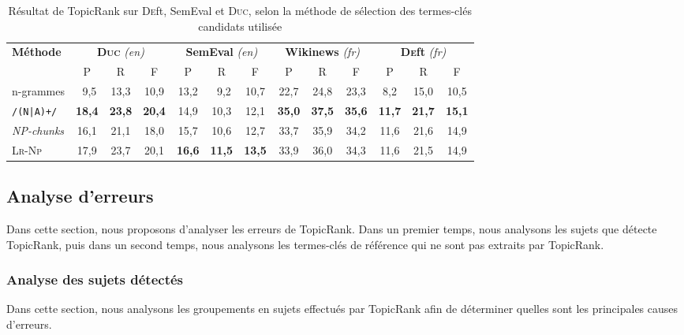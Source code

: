         \begin{table}
          \centering
          \begin{tabular}{l|c@{~~}c@{~~}c@{~}|c@{~~}c@{~~}c@{~}|c@{~~}c@{~~}c@{~}|c@{~~}c@{~~}c@{~}}
            \toprule
            \multirow{2}{*}[-2pt]{\textbf{Méthode}} & \multicolumn{3}{c|}{\textbf{\textsc{Duc}} \textit{(en)}} & \multicolumn{3}{c|}{\textbf{SemEval} \textit{(en)}} & \multicolumn{3}{c|}{\textbf{Wikinews} \textit{(fr)}} & \multicolumn{3}{c}{\textbf{\textsc{De}ft} \textit{(fr)}}\\
            \cline{2-4}\cline{5-7}\cline{8-10}\cline{11-13}
            & P & R & F & P & R & F & P & R & F & P & R & F\\
            \hline
            n-grammes & $~~$9,5 & 13,3 & 10,9 & 13,2 & $~~$9,2 & 10,7 & 22,7 & 24,8 & 23,3 & 8,2 & 15,0 & 10,5\\
            \texttt{/(N|A)+/} & \textbf{18,4} & \textbf{23,8} & \textbf{20,4} & 14,9 & 10,3 & 12,1 & \textbf{35,0} & \textbf{37,5} & \textbf{35,6} & \textbf{11,7} & \textbf{21,7} & \textbf{15,1}\\
            \textit{NP-chunks} & 16,1 & 21,1 & 18,0 & 15,7 & 10,6 & 12,7 & 33,7 & 35,9 & 34,2 & 11,6 & 21,6 & 14,9\\
            \textsc{Lr-Np} & 17,9 & 23,7 & 20,1 & \textbf{16,6} & \textbf{11,5} & \textbf{13,5} & 33,9 & 36,0 & 34,3 & 11,6 & 21,5 & 14,9\\
            \bottomrule
          \end{tabular}
          \caption{
            Résultat de TopicRank sur \textsc{De}ft, SemEval et \textsc{Duc},
            selon la méthode de sélection des termes-clés candidats utilisée
            \label{tab:topicrank_candidate_selection}
          }
        \end{table}

      \subsection{Analyse d'erreurs}
      \label{subsec:main:domain_independent_keyphrase_extraction-unsupervised_automatic_keyphrase_extraction-error_analysis}
        Dans cette section, nous proposons d'analyser les erreurs de TopicRank.
        Dans un premier temps, nous analysons les sujets que détecte TopicRank,
        puis dans un second temps, nous analysons les termes-clés de référence
        qui ne sont pas extraits par Topic\-Rank.

        \subsubsection{Analyse des sujets détectés}
        \label{subsubsec:main:domain_independent_keyphrase_extraction-unsupervised_automatic_keyphrase_extraction-error_analysis-detected_topics}
          Dans cette section, nous analysons les groupements en sujets effectués
          par Topic\-Rank afin de déterminer quelles sont les principales causes
          d'erreurs.

